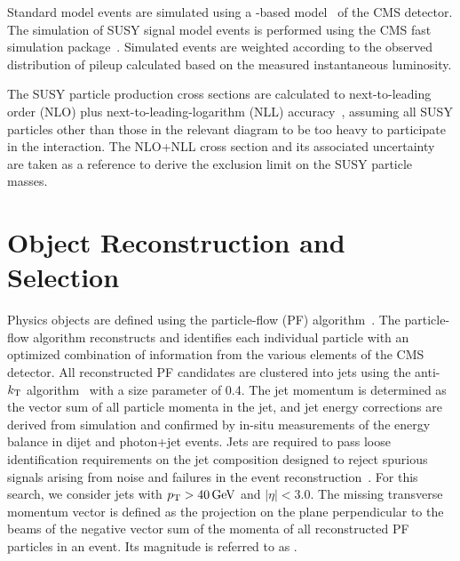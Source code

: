 Standard model events are simulated using a \GEANTfour-based model~\cite{G4} of the CMS detector.
The simulation of SUSY signal model events is performed using the CMS fast
simulation package~\cite{FastSim}. Simulated events are weighted 
according to the observed distribution of pileup calculated based on the measured 
instantaneous luminosity. 

The SUSY particle production cross sections are calculated to next-to-leading
order (NLO) plus next-to-leading-logarithm (NLL)
accuracy~\cite{NLONLL1,NLONLL2,NLONLL3,NLONLL4,NLONLL5,Borschensky:2014cia}, assuming all
SUSY particles other than those in the relevant diagram to be too
heavy to participate in the interaction. The NLO+NLL cross section and
its associated uncertainty~\cite{Kramer:2012bx} are taken as a
reference to derive the exclusion limit on the SUSY particle masses.


\section{Object Reconstruction and Selection}
\label{sec:Objects}

Physics objects are defined using the particle-flow (PF)
algorithm~\cite{PF1, PF2}. The particle-flow 
algorithm reconstructs and identifies each individual particle with an optimized
combination of information from the various elements of the CMS
detector. All reconstructed PF candidates are clustered into jets using the 
anti-$k_{\mathrm{T}}$ algorithm~\cite{antikt, fastjet} with a size parameter
of 0.4. The jet momentum is determined as the vector sum of all particle momenta
in the jet, and jet energy corrections are derived from simulation and
confirmed by in-situ measurements of the energy balance in dijet
and photon+jet events. Jets are required to pass loose identification requirements 
on the jet composition designed to reject spurious signals arising from noise and 
failures in the event reconstruction~\cite{CMS-PAS-JME-10-003}.
For this search, we consider jets with $p_{\mathrm{T}}>40\,\text{Ge\hspace{-.08em}V}$ and
$|\eta|<3.0$. The missing transverse momentum vector \ptvecmiss
is defined as the projection on the plane perpendicular to the beams of
the negative vector sum of the momenta of all reconstructed PF particles in
an event. Its magnitude is referred to as \ETmiss.

